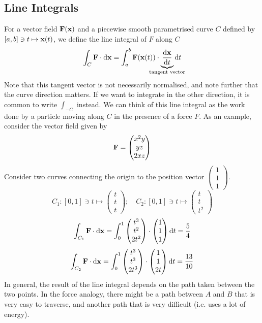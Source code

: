 \documentclass{article}
\begin{document}
\subsection{Line Integrals}
For a vector field $\vb F(\vb x)$ and a piecewise smooth parametrised curve $C$ defined by $[a, b] \ni t \mapsto \vb x(t)$, we define the line integral of $F$ along $C$
\[ \int_C \vb F \cdot \dd \vb x = \int_a^b \vb F(\vb x(t)) \cdot \underbrace{\frac{\dd \vb x}{\dd{t}}}_{\mathclap{\text{tangent vector}}} \dd{t} \]
Note that this tangent vector is not necessarily normalised, and note further that the curve direction matters. If we want to integrate in the other direction, it is common to write $\int_{-C}$ instead. We can think of this line integral as the work done by a particle moving along $C$ in the presence of a force $F$. As an example, consider the vector field given by
\[ \vb F = \begin{pmatrix}
        x^2 y \\ yz \\ 2xz
    \end{pmatrix} \]
Consider two curves connecting the origin to the position vector $\begin{pmatrix}
        1 \\ 1 \\ 1
    \end{pmatrix}$.
\[ C_1 \colon [0, 1] \ni t \mapsto \begin{pmatrix}
        t \\ t \\ t
    \end{pmatrix};\quad C_2 \colon [0, 1] \ni t \mapsto \begin{pmatrix}
        t \\ t \\ t^2
    \end{pmatrix} \]
\[ \int_{C_1}\vb F \cdot \dd \vb x = \int_0^1 \begin{pmatrix}
        t^3 \\ t^2 \\ 2t^2
    \end{pmatrix} \cdot \begin{pmatrix}
        1 \\ 1 \\ 1
    \end{pmatrix} \dd{t} = \frac{5}{4} \]
\[ \int_{C_2}\vb F \cdot \dd \vb x = \int_0^1 \begin{pmatrix}
        t^3 \\ t^3 \\ 2t^3
    \end{pmatrix} \cdot \begin{pmatrix}
        1 \\ 1 \\ 2t
    \end{pmatrix} \dd{t} = \frac{13}{10} \]
In general, the result of the line integral depends on the path taken between the two points. In the force analogy, there might be a path between $A$ and $B$ that is very easy to traverse, and another path that is very difficult (i.e. uses a lot of energy).
\end{document}
